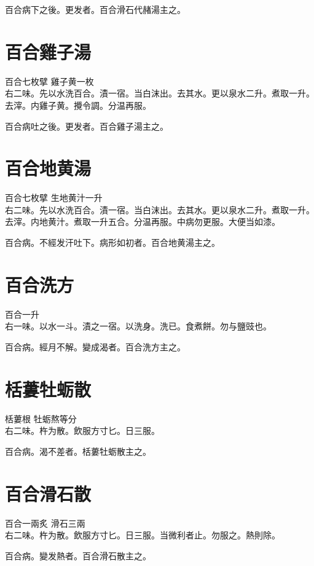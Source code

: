 百合病下之後。更发者。百合滑石代赭湯主之。

\section{百合雞子湯}

百合{\scriptsize 七枚擘} 雞子黄{\scriptsize 一枚}\\
右二味。先以水洗百合。漬一宿。当白沫出。去其水。更以泉水二升。煮取一升。去滓。内雞子黄。攪令調。分温再服。

百合病吐之後。更发者。百合雞子湯主之。

\section{百合地黄湯}

百合{\scriptsize 七枚擘} 生地黄汁{\scriptsize 一升}\\
右二味。先以水洗百合。漬一宿。当白沫出。去其水。更以泉水二升。煮取一升。去滓。内地黄汁。煮取一升五合。分温再服。中病勿更服。大便当如漆。

百合病。不經发汗吐下。病形如初者。百合地黄湯主之。

\section{百合洗方}

百合{\scriptsize 一升}\\
右一味。以水一斗。漬之一宿。以洗身。洗已。食煮餅。勿与鹽豉也。

百合病。經月不解。變成渴者。百合洗方主之。

\section{栝蔞牡蛎散}

栝蔞根{ }牡蛎{\scriptsize 熬等分}\\
右二味。杵为散。飲服方寸匕。日三服。

百合病。渴不差者。栝蔞牡蛎散主之。

\section{百合滑石散}

百合{\scriptsize 一兩炙} 滑石{\scriptsize 三兩}\\
右二味。杵为散。飲服方寸匕。日三服。当微利者止。勿服之。熱則除。

百合病。變发熱者。百合滑石散主之。

